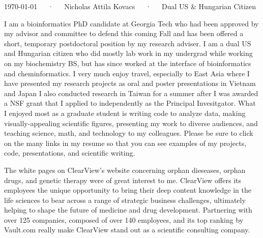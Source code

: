 \documentclass[11pt, letterpaper]{CV_latex_class}
\begin{document}
\makecvheader

\makecvfooter
  {\today~~~·~~~Nicholas Attila Kovacs~~~·~~~Dual US \& Hungarian Citizen}

\makelettertitle

\begin{cvletter}

I am a bioinformatics PhD candidate at Georgia Tech who had been approved by my advisor and committee to defend this coming Fall and has been offered a short, temporary postdoctoral position by my research adviser. I am a dual US and Hungarian citizen who did mostly lab work in my undergrad while working on my biochemistry BS, but has since worked at the interface of bioinformatics and cheminformatics. I very much enjoy travel, especially to East Asia where I have presented my research projects as oral and poster presentations in Vietnam and Japan I also conducted research in Taiwan for a summer after I was awarded a NSF grant that I applied to independently as the Principal Invesitgator. What I enjoyed most as a graduate student is writing code to analyze data, making visually-appealing scientific figures, presenting my work to diverse audiences, and teaching science, math, and technology to my colleagues. Please be sure to click on the many links in my resume so that you can see examples of my projects, code, presentations, and scientific writing.

The white pages on ClearView's website concerning orphan dieseases, orphan drugs, and genetic therapy were of great interest to me. ClearView offers its employees the unique opportunity to bring their deep content knowledge in the life sciences to bear across a range of strategic business challenges, ultimately helping to shape the future of medicine and drug development. Partnering with over 125 companies, composed of over 140 employees, and its top ranking by Vault.com really make ClearView stand out as a scientific consulting company.


\end{cvletter}
\end{document}

